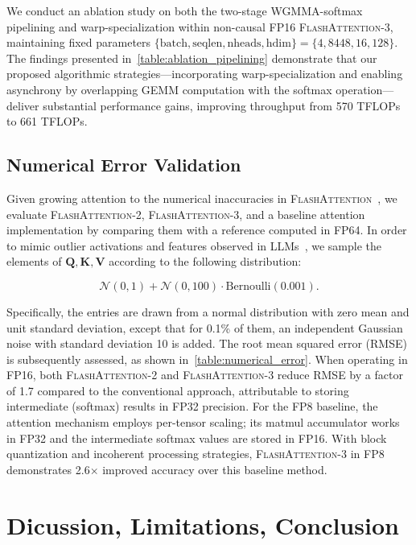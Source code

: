 \begin{enumerate}
We conduct an ablation study on both the two-stage WGMMA-softmax pipelining and warp-specialization within non-causal FP16 \textsc{FlashAttention-3}, maintaining fixed parameters $\{\text{batch}, \text{seqlen}, \text{nheads}, \text{hdim}\} = \{ 4, 8448, 16, 128\}$. The findings presented in~\cref{table:ablation_pipelining} demonstrate that our proposed algorithmic strategies—incorporating warp-specialization and enabling asynchrony by overlapping GEMM computation with the softmax operation—deliver substantial performance gains, improving throughput from 570 TFLOPs to 661 TFLOPs.

\subsection{Numerical Error Validation}
\label{sec:numerical_error}

Given growing attention to the numerical inaccuracies in \textsc{FlashAttention}~\citep{golden2024flash}, we evaluate \textsc{FlashAttention-2}, \textsc{FlashAttention-3}, and a baseline attention implementation by comparing them with a reference computed in FP64. In order to mimic outlier activations and features observed in LLMs~\citep{dettmers2208llm, sun2024massive}, we sample the elements of $\mathbf{Q}, \mathbf{K}, \mathbf{V}$ according to the following distribution:

\begin{equation*}
  \mathcal{N}(0, 1) + \mathcal{N}(0, 100) \cdot \mathrm{Bernoulli}(0.001).
\end{equation*}

Specifically, the entries are drawn from a normal distribution with zero mean and unit standard deviation, except that for 0.1\% of them, an independent Gaussian noise with standard deviation 10 is added. The root mean squared error (RMSE) is subsequently assessed, as shown in~\cref{table:numerical_error}. When operating in FP16, both \textsc{FlashAttention-2} and \textsc{FlashAttention-3} reduce RMSE by a factor of 1.7 compared to the conventional approach, attributable to storing intermediate (softmax) results in FP32 precision. For the FP8 baseline, the attention mechanism employs per-tensor scaling; its matmul accumulator works in FP32 and the intermediate softmax values are stored in FP16. With block quantization and incoherent processing strategies, \textsc{FlashAttention-3} in FP8 demonstrates 2.6$\times$ improved accuracy over this baseline method.

\section{Dicussion, Limitations, Conclusion}
\label{sec:discussion}


\end{enumerate}
